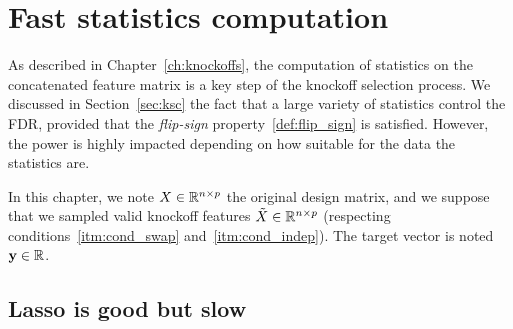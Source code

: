 \chapter{Fast statistics computation}\label{ch:fsc}

As described in Chapter~\ref{ch:knockoffs},
the computation of statistics on the concatenated feature matrix
is a key step of the knockoff selection process.
We discussed in Section~\ref{sec:ksc} the fact that a large variety of statistics control the FDR,
provided that the \textit{flip-sign} property~\ref{def:flip_sign} is satisfied.
However, the power is highly impacted depending on how suitable for the data the statistics are.

In this chapter, we note $X \in \mathbb{R}^{n \times p}$ the original design matrix,
and we suppose that we sampled valid knockoff features $\tilde{X}\in \mathbb{R}^{n \times p}$
(respecting conditions~\ref{itm:cond_swap} and~\ref{itm:cond_indep}).
The target vector is noted $\mathbf{y} \in \mathbb{R}$.

\section{Lasso is good but slow}\label{sec:}

